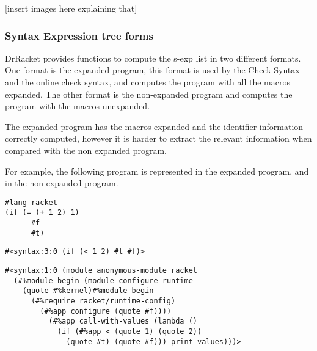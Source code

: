 [insert images here explaining that]


\subsubsection{Syntax Expression tree forms}
DrRacket provides functions to compute the s-exp list in two different formats.
One format is the expanded program, this format is used by the Check Syntax and
the online check syntax, and computes the program with all the macros expanded. %
The other format is the non-expanded program and computes the program with the macros
unexpanded.

The expanded program has the macros expanded and the identifier information correctly
computed, however it is harder to extract the relevant information when compared with the
non expanded program.

For example, the following program is represented in the expanded program,
and in the non expanded program.
\begin{lstlisting}[basicstyle=\ttfamily, caption="example"]
#lang racket
(if (= (+ 1 2) 1)
      #f
      #t)
\end{lstlisting}

\begin{lstlisting}[basicstyle=\ttfamily, caption="Syntax from Example"]
#<syntax:3:0 (if (< 1 2) #t #f)>
\end{lstlisting} %

\begin{lstlisting}[basicstyle=\ttfamily, caption="Expanded Syntax from example"]
#<syntax:1:0 (module anonymous-module racket
  (#%module-begin (module configure-runtime
    (quote #%kernel)#%module-begin
      (#%require racket/runtime-config)
        (#%app configure (quote #f))))
          (#%app call-with-values (lambda ()
            (if (#%app < (quote 1) (quote 2))
              (quote #t) (quote #f))) print-values)))>
\end{lstlisting}



